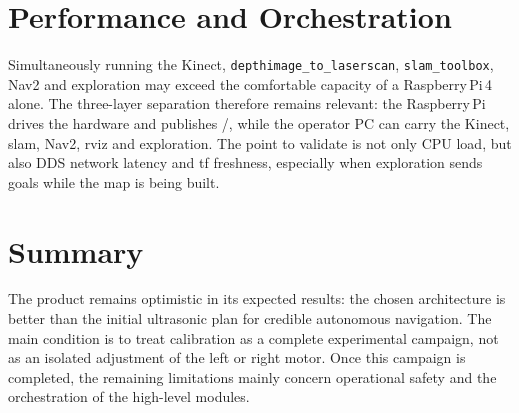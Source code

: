 \section{Performance and Orchestration}
\label{sec:lim_perf}

Simultaneously running the Kinect, \texttt{depthimage\_to\_laserscan},
\texttt{slam\_toolbox}, Nav2 and exploration may exceed the comfortable capacity of a
Raspberry\,Pi\,4 alone. The three-layer separation therefore remains relevant: the
Raspberry\,Pi drives the hardware and publishes /,
while the operator PC can carry the Kinect, \gls{slam}, Nav2, \gls{rviz} and
exploration. The point to validate is not only CPU load, but also DDS network latency
and \gls{tf} freshness, especially when exploration sends goals while the map is being
built.

\section{Summary}
\label{sec:lim_synthese}

The product remains optimistic in its expected results: the chosen architecture is
better than the initial ultrasonic plan for credible autonomous navigation. The main
condition is to treat calibration as a complete experimental campaign, not as an
isolated adjustment of the left or right motor. Once this campaign is completed, the
remaining limitations mainly concern operational safety and the orchestration of the
high-level modules.
